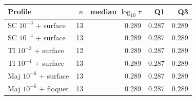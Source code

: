 \begin{tabular}{lrrrr}
\toprule
Profile & $n$ & median $\log_{10}\tau$ & Q1 & Q3 \\
\midrule
SC $10^{-3}$ + surface & 13 & 0.289 & 0.287 & 0.289 \\
SC $10^{-4}$ + surface & 13 & 0.289 & 0.287 & 0.289 \\
TI $10^{-3}$ + surface & 12 & 0.289 & 0.287 & 0.289 \\
TI $10^{-4}$ + surface & 13 & 0.289 & 0.287 & 0.289 \\
Maj $10^{-6}$ + surface & 13 & 0.289 & 0.287 & 0.289 \\
Maj $10^{-6}$ + floquet & 13 & 0.289 & 0.287 & 0.289 \\
\bottomrule
\end{tabular}
